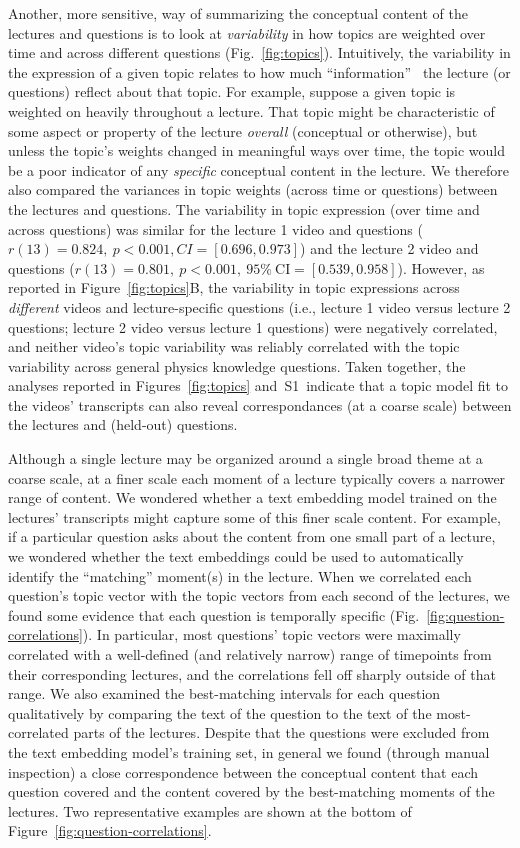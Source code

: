 \documentclass[10pt]{article}
\newcommand{\topicWeights}{S1}
\begin{document}
Another, more sensitive, way of summarizing the conceptual content of the
lectures and questions is to look at \textit{variability} in how topics are
weighted over time and across different questions (Fig.~\ref{fig:topics}).
Intuitively, the variability in the expression of a given topic relates to how
much ``information''~\citep{Fish22} the lecture (or questions) reflect about
that topic. For example, suppose a given topic is weighted on heavily
throughout a lecture. That topic might be characteristic of some aspect or
property of the lecture \textit{overall} (conceptual or otherwise), but unless
the topic's weights changed in meaningful ways over time, the topic would be a
poor indicator of any \textit{specific} conceptual content in the lecture. We
therefore also compared the variances in topic weights (across time or
questions) between the lectures and questions. The variability in topic
expression (over time and across questions) was similar for the lecture 1 video
and questions ($r(13) = 0.824,~p<0.001, CI = [0.696, 0.973]$) and the lecture 2
video and questions ($r(13) = 0.801,~p<0.001,~95\%~\mathrm{CI} = [0.539,
0.958]$). However, as reported in Figure~\ref{fig:topics}B, the variability in
topic expressions across \textit{different} videos and lecture-specific
questions (i.e., lecture 1 video versus lecture 2 questions; lecture 2 video
versus lecture 1 questions) were negatively correlated, and neither
video's topic variability was reliably correlated with the topic variability
across general physics knowledge questions. Taken together, the analyses
reported in Figures~\ref{fig:topics} and~\topicWeights~indicate that a topic
model fit to the videos' transcripts can also reveal correspondances (at a
coarse scale) between the lectures and (held-out) questions.

Although a single lecture may be organized around a single broad theme at a
coarse scale, at a finer scale each moment of a lecture typically covers a
narrower range of content. We wondered whether a text embedding model trained
on the lectures' transcripts might capture some of this finer scale content.
For example, if a particular question asks about the content from one small
part of a lecture, we wondered whether the text embeddings could be used to
automatically identify the ``matching'' moment(s) in the lecture. When we
correlated each question's topic vector with the topic vectors from each second
of the lectures, we found some evidence that each question is temporally
specific (Fig.~\ref{fig:question-correlations}). In particular, most questions'
topic vectors were maximally correlated with a well-defined (and relatively
narrow) range of timepoints from their corresponding lectures, and the
correlations fell off sharply outside of that range. We also examined the
best-matching intervals for each question qualitatively by comparing the text
of the question to the text of the most-correlated parts of the lectures.
Despite that the questions were excluded from the text embedding model's
training set, in general we found (through manual inspection) a close
correspondence between the conceptual content that each question covered and
the content covered by the best-matching moments of the lectures. Two
representative examples are shown at the bottom of
Figure~\ref{fig:question-correlations}.
\end{document}
